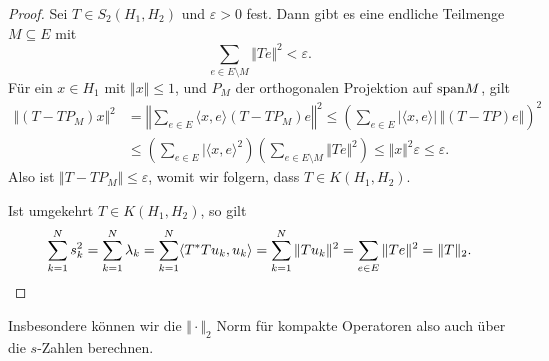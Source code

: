 \begin{proof}
    Sei $T \in S_2(H_1, H_2)$ und $\varepsilon > 0$ fest. Dann gibt es eine endliche Teilmenge $M \subseteq E$ mit
    \[
        \sum_{e \in E \setminus M} \Vert Te \Vert^2 < \varepsilon.
    \]
    Für ein $x \in H_1$ mit $\Vert x \Vert \leq 1$, und $P_M$ der orthogonalen Projektion auf $\mathrm{span} M$, gilt
    \begin{align*}        
        \Vert (T - T P_M)x \Vert^2
        &=
        \left\Vert \sum_{e \in E} \langle x, e \rangle (T - TP_M) e \right\Vert^2 
        \leq
        \left( \sum_{e \in E} \vert \langle x, e \rangle \vert \, \Vert (T - TP) e \Vert \right)^2 \\
        &\leq
        \left( \sum_{e \in E} \vert \langle x, e \rangle^2 \right) \left( \sum_{e \in E \setminus M} \Vert T e \Vert^2 \right)
        \leq
        \Vert x \Vert^2 \varepsilon
        \leq
        \varepsilon.
    \end{align*}
    Also ist $\Vert T - TP_M \Vert \leq \varepsilon$, womit wir folgern, dass $T \in K(H_1, H_2)$.

    Ist umgekehrt $T \in K(H_1, H_2)$, so gilt
    \[
        \sum_{k=1}^N s_k^2
        =
        \sum_{k=1}^N \lambda_k
        =
        \sum_{k=1}^N \langle T^* T u_k, u_k \rangle
        =
        \sum_{k=1}^N \Vert T u_k \Vert^2
        =
        \sum_{e \in E} \Vert T e \Vert^2 = \Vert T \Vert_2. \qedhere
    \]
\end{proof}

Insbesondere können wir die $\Vert \cdot \Vert_2$ Norm für kompakte Operatoren also auch über die $s$-Zahlen berechnen.